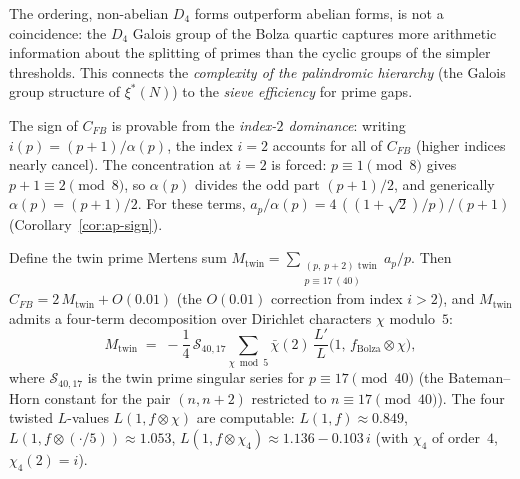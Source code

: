 \begin{remark}
\begin{remark}
The ordering, non-abelian $D_4$ forms outperform abelian forms, is
not a coincidence: the $D_4$ Galois group of the Bolza quartic captures
more arithmetic information about the splitting of primes than the
cyclic groups of the simpler thresholds.
This connects the \emph{complexity of the palindromic hierarchy}
(the Galois group structure of $\xi^*(N)$) to the \emph{sieve efficiency}
for prime gaps.
\end{remark}

\noindent
The sign of $C_{FB}$ is provable from the
\emph{index-$2$ dominance}: writing
$i(p) = (p{+}1)/\alpha(p)$, the index $i = 2$ accounts
for all of $C_{FB}$ (higher indices nearly cancel).
The concentration at $i = 2$ is forced: $p \equiv 1 \pmod{8}$
gives $p + 1 \equiv 2 \pmod{8}$, so $\alpha(p)$ divides the
odd part $(p{+}1)/2$, and generically $\alpha(p) = (p{+}1)/2$.
For these terms,
$a_p/\alpha(p) = 4\,(({1{+}\sqrt{2}})/p)/(p{+}1)$
(Corollary~\ref{cor:ap-sign}).

\begin{corollary}
\label{cor:cfb-decomposition}
Define the twin prime Mertens sum
$M_{\mathrm{twin}} = \sum_{\substack{(p,\,p{+}2)\text{ twin}\\
p \equiv 17\,(40)}} a_p/p$.
Then $C_{FB} = 2\,M_{\mathrm{twin}} + O(0.01)$
(the $O(0.01)$ correction from index $i > 2$),
and $M_{\mathrm{twin}}$ admits a four-term decomposition
over Dirichlet characters $\chi$ modulo~$5$:
\begin{equation}\label{eq:cfb-decomposition}
  M_{\mathrm{twin}}
  \;=\; -\frac{1}{4}\,\mathcal{S}_{40,17}
  \sum_{\chi \bmod 5} \bar\chi(2)\,
  \frac{L'}{L}\!\bigl(1,\, f_{\mathrm{Bolza}} \otimes \chi\bigr),
\end{equation}
where $\mathcal{S}_{40,17}$ is the twin prime singular
series for $p \equiv 17 \pmod{40}$
(the Bateman--Horn constant for the pair $(n, n{+}2)$
restricted to $n \equiv 17 \pmod{40}$).
The four twisted $L$-values
$L(1, f \otimes \chi)$ are computable:
$L(1, f) \approx 0.849$,
$L(1, f \otimes ({\cdot}/5)) \approx 1.053$,
$L(1, f \otimes \chi_4) \approx 1.136 - 0.103\,i$
(with $\chi_4$ of order~$4$, $\chi_4(2) = i$).
\end{corollary}


\end{remark}

